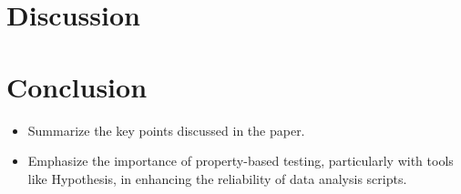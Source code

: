 \documentclass[runningheads]{llncs}
\begin{document}
\section{Discussion}

\section{Conclusion}
\begin{itemize}
  \item Summarize the key points discussed in the paper.
  \item Emphasize the importance of property-based testing, particularly with tools like Hypothesis, in enhancing the reliability of data analysis scripts.
\end{itemize}
%
%
%


\end{document}
